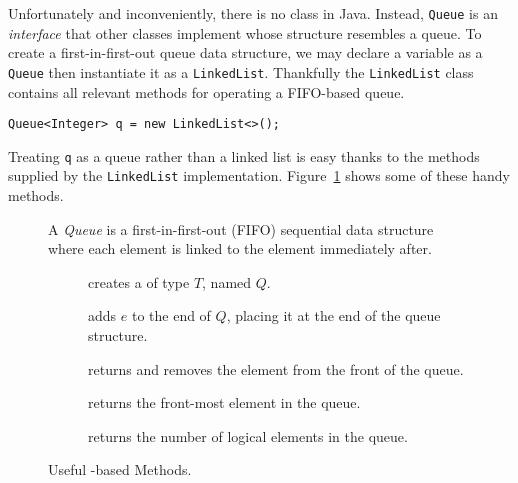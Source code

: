 Unfortunately and inconveniently, there is no  class in Java. Instead, \texttt{Queue} is an \textit{interface} that other classes implement whose structure resembles a queue. To create a first-in-first-out queue data structure, we may declare a variable as a \texttt{Queue} then instantiate it as a \texttt{LinkedList}. Thankfully the \texttt{LinkedList} class contains all relevant methods for operating a FIFO-based queue.
\begin{verbatim}
Queue<Integer> q = new LinkedList<>();
\end{verbatim}
Treating \texttt{q} as a queue rather than a linked list is easy thanks to the methods supplied by the \texttt{LinkedList} implementation. Figure~\ref{fig:queues} shows some of these handy methods. 
\begin{figure}[tp]
  \small
  \begin{tcolorbox}[title=Java Queue]
    A \textit{Queue} is a first-in-first-out (FIFO) sequential data structure where each element is linked to the element immediately after.
    \vspace{2ex}
  \begin{description}
    \item [] creates a  of type $T$, named $Q$.
     \item [] adds $e$ to the end of $Q$, placing it at the end of the queue structure.
     \item [] returns and removes the element from the front of the queue.
     \item [] returns the front-most element in the queue.
    \item [] returns the number of logical elements in the queue.
  \end{description}
\end{tcolorbox}
  \caption{Useful -based Methods.}
  \label{fig:queues}
\end{figure}


